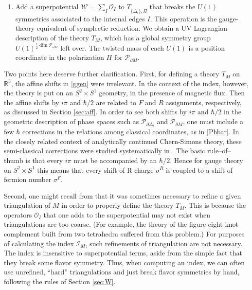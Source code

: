 \documentclass[11pt,letterpaper]{article}
\numberwithin{equation}{section}
\newcommand{\R}{{\mathbb R}}
\newcommand{\pd}{\partial}
\newcommand{\CI}{\mathcal{I}}
\newcommand{\CO}{\mathcal{O}}
\newcommand{\CP}{\mathcal{P}}
\newcommand{\CW}{\mathcal{W}}
\begin{document}
\begin{enumerate}
\item \label{step5} Add a superpotential $\CW = \sum_I \CO_I$ to $T_{\{\Delta_i\},\tilde\Pi}$ that breaks the $U(1)$ symmetries associated to the internal edges $I$. This operation is the gauge-theory equivalent of symplectic reduction. We obtain a UV Lagrangian description of the theory $T_M$, which has a global symmetry group $U(1)^{\frac12\dim \CP_{\pd M}}$
left over. The twisted mass of each $U(1)$ is a position coordinate in the polarization $\Pi$ for $\CP_{\pd M}$.


\end{enumerate}


Two points here deserve further clarification. First, for defining a theory $T_M$ on $\R^3$, the affine shifts in \eqref{ggen} were irrelevant. In the context of the index, however, the theory is put on an $S^2\times S^1$ geometry, in the presence of magnetic flux. Then the affine shifts by $i\pi$ and $\hbar/2$ are related to $F$ and $R$ assignments, respectively, as discussed in Section \ref{sec:aff}. In order to see both shifts by $i\pi$ and $\hbar/2$ in the geometric description of phase spaces such as $\CP_{\pd\Delta_i}$ and $\CP_{\pd M}$, one must include a few $\hbar$ corrections in the relations among classical coordinates, as in \eqref{Phbar}. In the closely related context of analytically continued Chern-Simons theory, these semi-classical corrections were studied systematically in \cite{Dimofte-QRS}. The basic rule--of--thumb is that every $i\pi$ must be accompanied by an $\hbar/2$. Hence for gauge theory on $S^2\times S^1$ this means that every shift of R-charge $\sigma^R$ is coupled to a shift of fermion number $\sigma^F$.

Second, one might recall from \cite{DGG} that it was sometimes necessary to refine a given triangulation of $M$ in order to properly define the theory $T_M$. This is because the operators $\CO_I$ that one adds to the superpotential may not exist when triangulations are too coarse. (For example, the theory of the figure-eight knot complement built from two tetrahedra suffered from this problem.) For purposes of calculating the index $\CI_M$, such refinements of triangulation are not necessary. The index is insensitive to superpotential terms, aside from the simple fact that they break some flavor symmetry. Thus, when computing an index, we can often use unrefined, ``hard'' triangulations and just break flavor symmetries by hand, following the rules of Section \ref{sec:W}.
\end{document}
